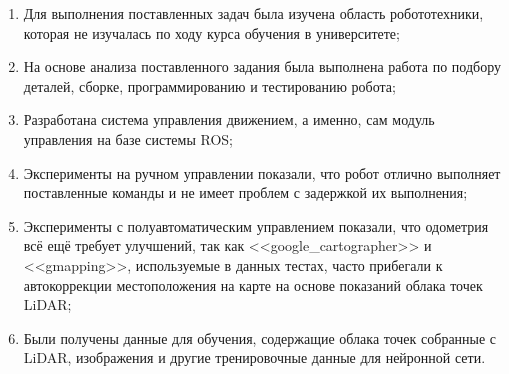 \begin{enumerate}
  \item Для выполнения поставленных задач была изучена область робототехники, которая не изучалась по ходу курса обучения в университете;
  \item На основе анализа поставленного задания была выполнена работа по подбору деталей, сборке, программированию и тестированию робота;
  \item Разработана система управления движением, а именно, сам модуль управления на базе системы ROS;
  \item Эксперименты на ручном управлении показали, что робот отлично выполняет поставленные команды и не имеет проблем с задержкой их выполнения;
  \item Эксперименты с полуавтоматическим управлением показали, что одометрия всё ещё требует улучшений, так как <<google\_cartographer>> и <<gmapping>>, используемые в данных тестах, часто прибегали к автокоррекции местоположения на карте на основе показаний облака точек LiDAR;
  \item Были получены данные для обучения, содержащие облака точек собранные с LiDAR, изображения и другие тренировочные данные для нейронной сети. 
\end{enumerate}
